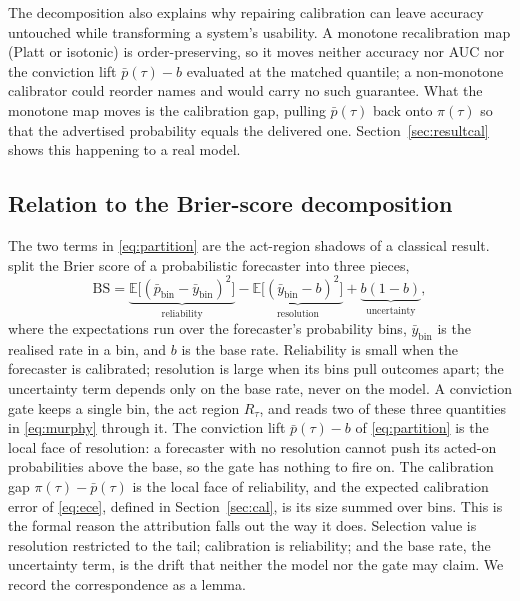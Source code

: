 \documentclass{sbc2023}%
\theoremstyle{definition}
\theoremstyle{plain}
\begin{document}
The decomposition also explains why repairing calibration can leave accuracy
untouched while transforming a system's usability. A monotone recalibration map (Platt
or isotonic) is order-preserving, so it moves neither accuracy nor AUC nor the
conviction lift $\bar p(\tau)-b$ evaluated at the matched quantile; a non-monotone
calibrator could reorder names and would carry no such guarantee. What the monotone
map moves is the calibration gap, pulling $\bar p(\tau)$ back onto $\pi(\tau)$ so that
the advertised probability equals the delivered one. Section~\ref{sec:resultcal} shows
this happening to a real model.

\subsection{Relation to the Brier-score decomposition}
\label{sec:brier}
The two terms in \eqref{eq:partition} are the act-region shadows of a classical
result. \citet{murphy1973} split the Brier score of a probabilistic forecaster into
three pieces,
\begin{equation}
\label{eq:murphy}
\mathrm{BS}=\underbrace{\mathbb{E}\big[(\bar p_{\text{bin}}-\bar y_{\text{bin}})^2\big]}_{\text{reliability}}
-\underbrace{\mathbb{E}\big[(\bar y_{\text{bin}}-b)^2\big]}_{\text{resolution}}
+\underbrace{b(1-b)}_{\text{uncertainty}},
\end{equation}
where the expectations run over the forecaster's probability bins, $\bar y_{\text{bin}}$
is the realised rate in a bin, and $b$ is the base rate. Reliability is small when the
forecaster is calibrated; resolution is large when its bins pull outcomes apart; the
uncertainty term depends only on the base rate, never on the model. A conviction gate
keeps a single bin, the act region $R_\tau$, and reads two of these three quantities
in \eqref{eq:murphy} through it. The conviction lift $\bar p(\tau)-b$ of \eqref{eq:partition} is the local
face of resolution: a forecaster with no resolution cannot push its acted-on
probabilities above the base, so the gate has nothing to fire on. The calibration gap
$\pi(\tau)-\bar p(\tau)$ is the local face of reliability, and the expected calibration
error of \eqref{eq:ece}, defined in Section~\ref{sec:cal}, is its size summed over
bins. This is the formal reason the
attribution falls out the way it does. Selection value is resolution restricted to the
tail; calibration is reliability; and the base rate, the uncertainty term, is the drift
that neither the model nor the gate may claim. We record the correspondence as a lemma.
\end{document}
